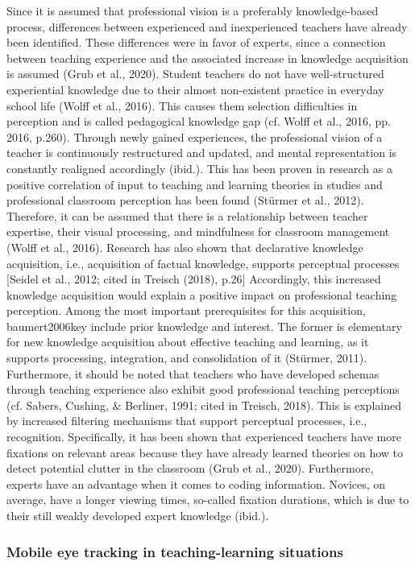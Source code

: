 \documentclass[
  man]{apa6}
\begin{document}
Since it is assumed that professional vision is a preferably knowledge-based process, differences between experienced and inexperienced teachers have already been identified. These differences were in favor of experts, since a connection between teaching experience and the associated increase in knowledge acquisition is assumed (Grub et al., 2020). Student teachers do not have well-structured experiential knowledge due to their almost non-existent practice in everyday school life (Wolff et al., 2016). This causes them selection difficulties in perception and is called pedagogical knowledge gap (cf. Wolff et al., 2016, pp. 2016, p.260). Through newly gained experiences, the professional vision of a teacher is continuously restructured and updated, and mental representation is constantly realigned accordingly (ibid.). This has been proven in research as a positive correlation of input to teaching and learning theories in studies and professional classroom perception has been found (Stürmer et al., 2012). Therefore, it can be assumed that there is a relationship between teacher expertise, their visual processing, and mindfulness for classroom management (Wolff et al., 2016). Research has also shown that declarative knowledge acquisition, i.e., acquisition of factual knowledge, supports perceptual processes {[}Seidel et al., 2012; cited in Treisch (2018), p.26{]} Accordingly, this increased knowledge acquisition would explain a positive impact on professional teaching perception. Among the most important prerequisites for this acquisition, baumert2006key include prior knowledge and interest. The former is elementary for new knowledge acquisition about effective teaching and learning, as it supports processing, integration, and consolidation of it (Stürmer, 2011). Furthermore, it should be noted that teachers who have developed schemas through teaching experience also exhibit good professional teaching perceptions (cf. Sabers, Cushing, \& Berliner, 1991; cited in Treisch, 2018). This is explained by increased filtering mechanisms that support perceptual processes, i.e., recognition. Specifically, it has been shown that experienced teachers have more fixations on relevant areas because they have already learned theories on how to detect potential clutter in the classroom (Grub et al., 2020). Furthermore, experts have an advantage when it comes to coding information. Novices, on average, have a longer viewing times, so-called fixation durations, which is due to their still weakly developed expert knowledge (ibid.).

\subsubsection{Mobile eye tracking in teaching-learning situations}\label{mobile-eye-tracking-in-teaching-learning-situations}
\end{document}

